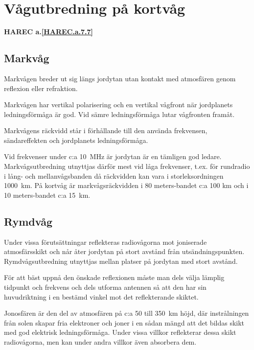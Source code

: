 \section{Vågutbredning på kortvåg}
\textbf{
HAREC a.\ref{HAREC.a.7.7}\label{myHAREC.a.7.7}
}

\subsection{Markvåg}

Markvågen breder ut sig längs jordytan utan kontakt med atmosfären
genom reflexion eller refraktion.

Markvågen har vertikal polarisering och en vertikal vågfront när
jordplanets ledningsförmåga är god. Vid sämre ledningsförmåga lutar
vågfronten framåt.

Markvågens räckvidd står i förhållande till den använda frekvensen,
sändareffekten och jordplanets ledningsförmåga.

Vid frekvenser under c:a 10~MHz är jordytan är en tämligen god
ledare. Markvågsutbredning utnyttjas därför mest vid låga frekvenser,
t.ex. för rundradio i lång- och mellanvågsbanden då räckvidden kan
vara i storleksordningen 1000~km. På kortvåg är markvågsräckvidden i
80 meters-bandet c:a 100 km och i 10 meters-bandet c:a 15~km.

\subsection{Rymdvåg}

Under vissa förutsättningar reflekteras radiovågorna mot joniserade
atmosfärsskikt och når åter jordytan på stort avstånd från
utsändningspunkten. Rymdvågsutbredning utnyttjas mellan platser på
jordytan med stort avstånd.

För att bäst uppnå den önskade reflexionen måste man dels välja
lämplig tidpunkt och frekvens och dels utforma antennen så att den har
sin huvudriktning i en bestämd vinkel mot det reflekterande skiktet.

Jonosfären är den del av atmosfären på c:a 50 till 350~km höjd, där
instrålningen från solen skapar fria elektroner och joner i en sådan
mängd att det bildas skikt med god elektrisk ledningsförmåga. Under
vissa villkor reflekterar dessa skikt radiovågorna, men kan under
andra villkor även absorbera dem.

